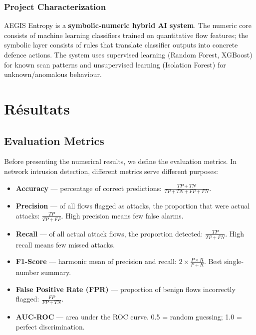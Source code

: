 \documentclass[12pt,a4paper]{report}
\begin{document}
\subsection{Project Characterization}

AEGIS Entropy is a \textbf{symbolic-numeric hybrid AI system}. The numeric core consists of machine learning classifiers trained on quantitative flow features; the symbolic layer consists of rules that translate classifier outputs into concrete defence actions. The system uses supervised learning (Random Forest, XGBoost) for known scan patterns and unsupervised learning (Isolation Forest) for unknown/anomalous behaviour.

\chapter{R\'{e}sultats}\label{ch:resultats}

\section{Evaluation Metrics}

Before presenting the numerical results, we define the evaluation metrics. In network intrusion detection, different metrics serve different purposes:

\begin{itemize}
    \item \textbf{Accuracy} --- percentage of correct predictions: $\frac{TP + TN}{TP + TN + FP + FN}$.
    \item \textbf{Precision} --- of all flows flagged as attacks, the proportion that were actual attacks: $\frac{TP}{TP + FP}$. High precision means few false alarms.
    \item \textbf{Recall} --- of all actual attack flows, the proportion detected: $\frac{TP}{TP + FN}$. High recall means few missed attacks.
    \item \textbf{F1-Score} --- harmonic mean of precision and recall: $2 \times \frac{P \times R}{P + R}$. Best single-number summary.
    \item \textbf{False Positive Rate (FPR)} --- proportion of benign flows incorrectly flagged: $\frac{FP}{FP + TN}$.
    \item \textbf{AUC-ROC} --- area under the ROC curve. 0.5 = random guessing; 1.0 = perfect discrimination.
\end{itemize}
\end{document}
